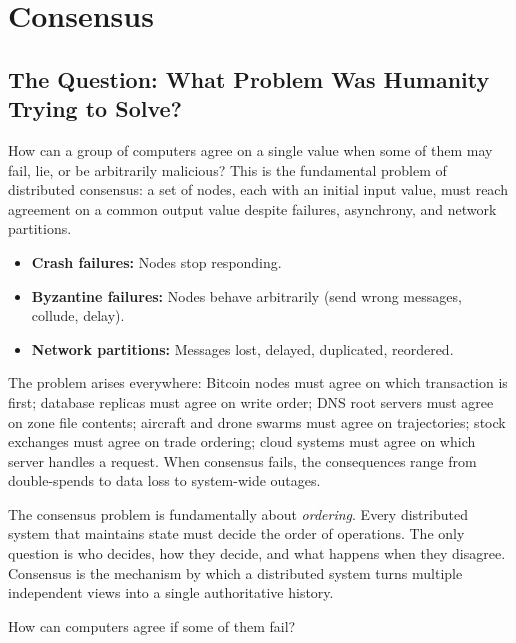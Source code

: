 
\chapter{Consensus}
\label{ch:consensus}

\section{The Question: What Problem Was Humanity Trying to Solve?}
\label{sec:consensus:question}

How can a group of computers agree on a single value when some of them may fail, lie, or be arbitrarily malicious? This is the fundamental problem of distributed consensus: a set of nodes, each with an initial input value, must reach agreement on a common output value despite failures, asynchrony, and network partitions.

\begin{itemize}
\item \textbf{Crash failures:} Nodes stop responding.
\item \textbf{Byzantine failures:} Nodes behave arbitrarily (send wrong messages, collude, delay).
\item \textbf{Network partitions:} Messages lost, delayed, duplicated, reordered.
\end{itemize}

The problem arises everywhere: Bitcoin nodes must agree on which transaction is first; database replicas must agree on write order; DNS root servers must agree on zone file contents; aircraft and drone swarms must agree on trajectories; stock exchanges must agree on trade ordering; cloud systems must agree on which server handles a request. When consensus fails, the consequences range from double-spends to data loss to system-wide outages.

The consensus problem is fundamentally about \emph{ordering}. Every distributed system that maintains state must decide the order of operations. The only question is who decides, how they decide, and what happens when they disagree. Consensus is the mechanism by which a distributed system turns multiple independent views into a single authoritative history.

How can computers agree if some of them fail?

